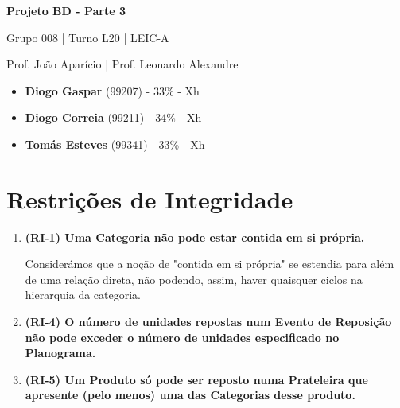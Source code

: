 \documentclass[12pt,a4paper]{article}
\begin{document}
  \begin{titlepage}
    \begin{center}
      \vspace*{5cm}

      \Huge
      \textbf{Projeto BD - Parte 3}

      \vspace{0.5cm}
      \LARGE
      Grupo 008 | Turno L20 | LEIC-A

      \vspace{0.5cm}
      \large
      Prof. João Aparício | Prof. Leonardo Alexandre

      \vfill
    \end{center}
    \large
    \begin{itemize}
      \item[] \textbf{Diogo Gaspar} (99207) - 33\% - Xh
      \item[] \textbf{Diogo Correia} (99211) - 34\% - Xh
      \item[] \textbf{Tomás Esteves} (99341) - 33\% - Xh
    \end{itemize}
  \end{titlepage}

  \section*{Restrições de Integridade}

  \begin{enumerate}
    \item \textbf{(RI-1) Uma Categoria não pode estar contida em si própria.}

    Considerámos que a noção de "contida em si própria" se estendia para além de uma
    relação direta, não podendo, assim, haver quaisquer ciclos na hierarquia da categoria.

    

    \item \textbf{(RI-4) O número de unidades repostas num Evento de Reposição
    não pode exceder o número de unidades especificado no Planograma.}

    

    \item \textbf{(RI-5) Um Produto só pode ser reposto numa Prateleira que apresente
    (pelo menos) uma das Categorias desse produto.}

    
  \end{enumerate}
\end{document}
